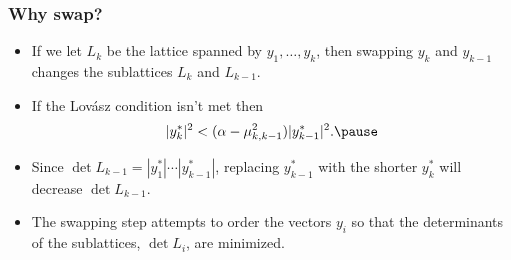 \documentclass{beamer}
\begin{document}
\begin{frame}
	\frametitle{Why swap?}
	\begin{itemize}
		\item If we let $L_k$ be the lattice spanned by $y_1, \ldots, y_k$, then swapping $y_k$ and $y_{k-1}$ changes the sublattices $L_k$ and $L_{k-1}$.\pause
		\item If the Lov\'asz condition isn't met then
		\[
		|y_k^*|^2 < (\alpha - \mu_{k,k-1}^2)|y_{k-1}^*|^2.\pause
		\]
		\item Since $\det L_{k-1} = |y_1^*|\cdots |y_{k-1}^*|$, replacing $y_{k-1}^*$ with the shorter $y_k^*$ will decrease $\det L_{k-1}$.\pause
		\item The swapping step attempts to order the vectors $y_i$ so that the determinants of the sublattices, $\det L_i$, are minimized.
	\end{itemize}
\end{frame}
\end{document}
